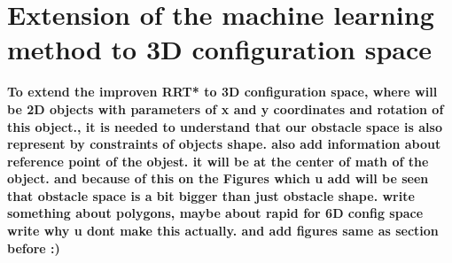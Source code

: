\documentclass{ctuthesis}
\begin{document}
\section{Extension of the machine learning method to 3D configuration space}
\textbf{To extend the improven RRT* to 3D configuration space, where will be 2D objects with parameters of x and y coordinates and rotation of this object., 
it is needed to understand that our obstacle space is also represent by constraints of objects shape.
also add information about reference point of the objest. it will be at the center of math of the object.
and because of this on the Figures which u add will be seen that obstacle space is a bit bigger than just obstacle shape.
write something about polygons, maybe about rapid for 6D config space write why u dont make this actually.
and add figures same as section before :)}
\end{document}
